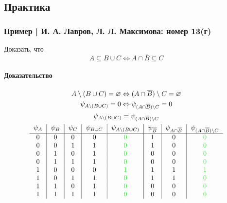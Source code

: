 \documentclass{article}
\begin{document}
\subsection{Практика}

\subsubsection{Пример | И. А. Лавров, Л. Л. Максимова: номер 13(г)}
Доказать, что
\[
    A \subseteq B \cup C \Leftrightarrow A \cap \overline{B} \subseteq C
\]

\paragraph{Доказательство}
\begin{gather*}
    A \setminus (B \cup C) = \varnothing \Leftrightarrow (A \cap \overline{B}) \setminus C = \varnothing \\
    \psi_{A \setminus (B \cup C)} = 0 \Leftrightarrow \psi_{(A \cap \overline{B}) \setminus C} = 0 \\
    \psi_{A \setminus (B \cup C)} = \psi_{(A \cap \overline{B}) \setminus C} \\
    \begin{tabular}{c|c|c|c|c|c|c|c}
        $\psi_A$ & $\psi_B$ & $\psi_C$ & $\psi_{B \cup C}$ & $\psi_{A \setminus (B \cup C)}$ & $\psi_{\overline{B}}$ & $\psi_{A \cap \overline{B}}$ & $\psi_{(A \cap \overline{B}) \setminus C}$ \\
        \hline
        0 & 0 & 0 & 0 & \textcolor{green}{0} & 1 & 0 & \textcolor{green}{0} \\
        0 & 0 & 1 & 1 & \textcolor{green}{0} & 1 & 0 & \textcolor{green}{0} \\
        0 & 1 & 0 & 1 & \textcolor{green}{0} & 0 & 0 & \textcolor{green}{0} \\
        0 & 1 & 1 & 1 & \textcolor{green}{0} & 0 & 0 & \textcolor{green}{0} \\
        1 & 0 & 0 & 0 & \textcolor{green}{1} & 1 & 1 & \textcolor{green}{1} \\
        1 & 0 & 1 & 1 & \textcolor{green}{0} & 1 & 1 & \textcolor{green}{0} \\
        1 & 1 & 0 & 1 & \textcolor{green}{0} & 0 & 0 & \textcolor{green}{0} \\
        1 & 1 & 1 & 1 & \textcolor{green}{0} & 0 & 0 & \textcolor{green}{0} \\  
    \end{tabular}
\end{gather*}
\end{document}
